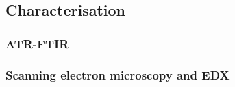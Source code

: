 \subsection{Characterisation}
\label{sec:characterisation}

\begin{table}[htbp]
  \centering
  \caption[Instruments and analytical figures of merit]{Instruments, operating parameters and analytical figures of merit. All measurements were carried out by the author. Limits of detection and quantitation were determined from $n \geq 7$ independent measurements of the calibration blank as $\mathrm{LOD} = 3.3\sigma_{\mathrm{blank}}/S$ and $\mathrm{LOQ} = 10\sigma_{\mathrm{blank}}/S$, where $S$ is the calibration slope.}
  \label{tab:instruments}
\end{table}


\subsubsection{ATR-FTIR}
\label{sec:ftir-method}

\subsubsection{Scanning electron microscopy and EDX}
\label{sec:sem-method}

